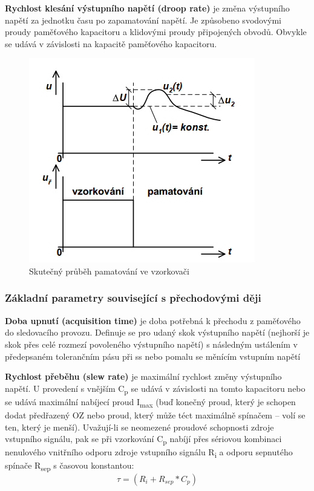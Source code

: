 \textbf{Rychlost klesání výstupního napětí (droop rate)} je změna výstupního napětí za jednotku
času po zapamatování napětí. Je způsobeno svodovými proudy paměťového kapacitoru a
klidovými proudy připojených obvodů. Obvykle se udává v závislosti na kapacitě
paměťového kapacitoru.
   \begin{figure}[h]
   \begin{center}
     \includegraphics[scale=0.6]{images/Droop.png}
   \end{center}
   \caption{Skutečný průběh pamatování ve vzorkovači}
  \end{figure}
\pagebreak

\subsubsection{Základní parametry související s přechodovými ději}
\textbf{Doba upnutí (acquisition time)} je doba potřebná k přechodu z paměťového do sledovacího provozu. Definuje se pro udaný skok výstupního napětí (nejhorší je skok přes celé rozmezí povoleného výstupního napětí) s následným ustálením v předepsaném tolerančním pásu při ss nebo pomalu se měnícím vstupním napětí

\textbf{Rychlost přeběhu (slew rate)} je maximální rychlost změny výstupního napětí. U provedení s vnějším C\textsubscript{p} se udává v závislosti na tomto kapacitoru nebo se udává maximální nabíjecí proud I\textsubscript{max} (buď konečný proud, který je schopen dodat předřazený OZ nebo proud, který může téct maximálně spínačem – volí se ten, který je menší). Uvažují-li se neomezené proudové schopnosti zdroje vstupního signálu, pak se při vzorkování C\textsubscript{p} nabíjí přes sériovou kombinaci nenulového vnitřního odporu zdroje vstupního signálu R\textsubscript{i} a odporu sepnutého spínače R\textsubscript{sep} s časovou konstantou:
\begin{equation}
\tau = (R_{i}+R_{sep}*C_{p})
\end{equation}

